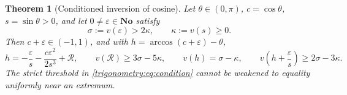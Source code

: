 \documentclass[11pt,letterpaper]{article}
\numberwithin{equation}{section}
\newtheorem{theorem}{Theorem}[section]
\theoremstyle{definition}
\theoremstyle{remark}
\newcommand{\No}{\mathbf{No}}
\newcommand{\eps}{\varepsilon}
\begin{document}
\begin{theorem}[Conditioned inversion of cosine]\label{trigonometry:thm:conditioned}
Let $\theta\in(0,\pi)$, $c=\cos\theta$, $s=\sin\theta>0$, and let $0\ne\eps\in\No$ satisfy
\begin{equation}\label{trigonometry:eq:condition}
 \sigma:=v(\eps)>2\kappa,\qquad \kappa:=v(s)\ge0 .
\end{equation}
Then $c+\eps\in(-1,1)$, and with $h=\arccos(c+\eps)-\theta$,
\begin{equation}\label{trigonometry:eq:inversecos}
 h=-\frac\eps s-\frac{c\eps^2}{2s^3}+\mathcal R,
 \qquad v(\mathcal R)\ge3\sigma-5\kappa,
 \qquad v(h)=\sigma-\kappa,
 \qquad v\!\left(h+\frac\eps s\right)\ge2\sigma-3\kappa .
\end{equation}
\emph{The strict threshold in \cref{trigonometry:eq:condition} cannot be weakened to equality
uniformly near an extremum.}
\end{theorem}
\end{document}
